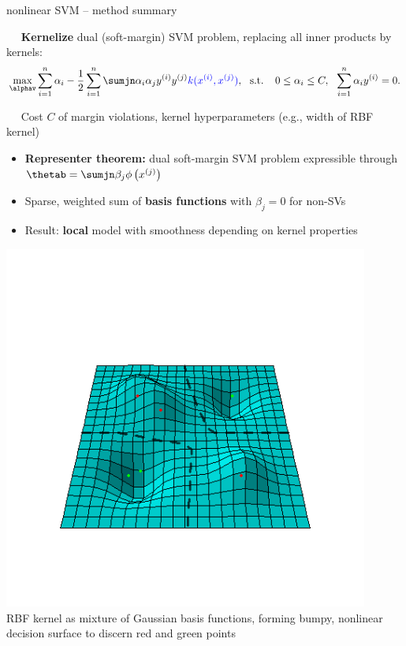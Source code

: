 \begin{frame}{nonlinear SVM -- method summary}

\footnotesize

 ~~ \textbf{Kernelize} dual (soft-margin) SVM problem, 
replacing all inner products by kernels:
$$\max_{\alphav} \sumin \alpha_i - \frac{1}{2}\sumin \sumjn
\alpha_i\alpha_j\yi y^{(j)} \textcolor{blue}{k(\xi, \xi[j])}, ~~ \text{s.t. } ~~ 
0 \le \alpha_i \le C, ~~ \sumin \alpha_i \yi = 0.
$$

\medskip

 ~~ Cost $C$ of margin violations, kernel 
hyperparameters (e.g., width of RBF kernel)

\medskip


\begin{minipage}[c]{0.5\textwidth}

  \begin{itemize}
    \item \textbf{Representer theorem:} dual soft-margin SVM problem expressible 
    through 
    $\thetab = \sumjn \beta_j \phi \left(\xi[j] \right)$ \\
    \item Sparse, weighted sum of \textbf{basis functions} with $\beta_j = 0$ 
    for non-SVs
    \item Result: \textbf{local} model with smoothness depending on kernel 
    properties
  \end{itemize}
\end{minipage}
\hfill
\begin{minipage}[c]{0.4\textwidth}
  \centering
  \includegraphics[width=0.9\textwidth, trim=0 70 0 100, clip]{
  ../slides/nonlinear-svm/figure/svm_rbf_as_basis.png} \\
  \tiny{RBF kernel as mixture of Gaussian basis functions, forming
  bumpy, nonlinear decision surface to discern red and green points}
\end{minipage}

\end{frame}


